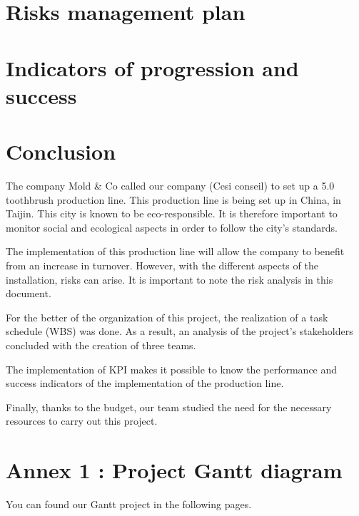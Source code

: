 \documentclass{article}
\begin{document}



\section{Risks management plan}
\label{risk-management}



\section{Indicators of progression and success}




\section{Conclusion} 

The company Mold \& Co called our company (Cesi conseil) to set up a 5.0 toothbrush production line. This production line is being set up in China, in Taijin. This city is known to be eco-responsible. It is therefore important to monitor social and ecological aspects in order to follow the city's standards.

The implementation of this production line will allow the company to benefit from an increase in turnover. However, with the different aspects of the installation, risks can arise. It is important to note the risk analysis in this document.

For the better of the organization of this project, the realization of a task schedule (WBS) was done.
As a result, an analysis of the project's stakeholders concluded with the creation of three teams.

The implementation of KPI makes it possible to know the performance and success indicators of the implementation of the production line.

Finally, thanks to the budget, our team studied the need for the necessary resources to carry out this project.

\section{Annex 1 : Project Gantt diagram}

You can found our Gantt project in the following pages.


\end{document}
